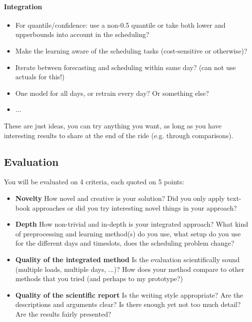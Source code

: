 \documentclass[a4,12pt]{article}
\begin{document}
\paragraph{Integration}
\begin{itemize}
\item For quantile/confidence: use a non-0.5 quantile or take both lower and upperbounds into account in the scheduling?
\item Make the learning aware of the scheduling tasks (cost-sensitive or otherwise)?
\item Iterate between forecasting and scheduling within same day? (can not use actuals for this!)
\item One model for all days, or retrain every day? Or something else?
\item ...
\end{itemize}

These are just ideas, you can try anything you want, as long as you have interesting results to share at the end of the ride (e.g. through comparisons).

\subsection*{Evaluation}
You will be evaluated on 4 criteria, each quoted on 5 points:
\begin{itemize}
\item \textbf{Novelty} How novel and creative is your solution? Did you only apply text-book approaches or did you try interesting novel things in your approach?
\item \textbf{Depth} How non-trivial and in-depth is your integrated approach? What kind of preprocessing and learning method(s) do you use, what setup do you use for the different days and timeslots, does the scheduling problem change?
\item \textbf{Quality of the integrated method} Is the evaluation scientifically sound (multiple loads, multiple days, ...)? How does your method compare to other methods that you tried (and perhaps to my prototype?)
\item \textbf{Quality of the scientific report} Is the writing style appropriate? Are the descriptions and arguments clear? Is there enough yet not too much detail? Are the results fairly presented?
\end{itemize}
\end{document}
